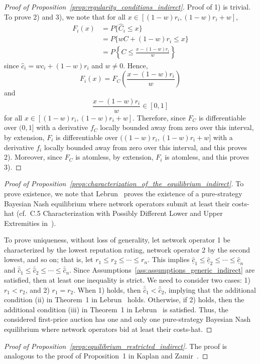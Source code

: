 \begin{proof}[Proof of Proposition~\ref{prop:regularity_conditions_indirect}]
Proof of 1) is trivial. To prove 2) and 3), we note that for all $x\in [(1-w)r_i, (1-w)r_i + w]$,
\begin{align*}
  F_i(x)
  &= P\{\hat{C}_i\le x\} \\
  &= P\{wC + (1-w)r_i\le x\} \\
  &= P\left\{ C\le \frac{x - (1-w)r_i}{w} \right\}
\end{align*}
since $\hat{c}_i = wc_i + (1-w)r_i$ and $w\neq 0$. Hence,
\begin{equation*}
  F_i(x) = F_C\left( \frac{x - (1-w)r_i}{w} \right)
\end{equation*}
and
\begin{equation*}
  \frac{x - (1-w)r_i}{w}\in [0,1]
\end{equation*}
for all $x\in [(1-w)r_i, (1-w)r_i + w]$. Therefore, since $F_C$ is differentiable over $(0,1]$ with a derivative $f_C$ locally bounded away from zero over this interval, by extension, $F_i$ is differentiable over $((1-w)r_i, (1-w)r_i + w]$ with a derivative $f_i$ locally bounded away from zero over this interval, and this proves 2). Moreover, since $F_C$ is atomless, by extension, $F_i$ is atomless, and this proves 3).
\end{proof}

\begin{proof}[Proof of Proposition~\ref{prop:characterization_of_the_equilibrium_indirect}]
To prove existence, we note that Lebrun~\cite{Lebrun2006} proves the existence of a pure-strategy Bayesian Nash equilibrium where network operators submit at least their costs-hat (cf.~C.5 Characterization with Possibly Different Lower and Upper Extremities in~\cite{Lebrun2006}).

To prove uniqueness, without loss of generality, let network operator 1 be characterized by the lowest reputation rating, network operator 2 by the second lowest, and so on; that is, let $r_1 \leq r_2 \leq\cdots \leq r_n$. This implies $\underline{\hat{c}}_1 \leq \underline{\hat{c}}_2 \leq\cdots \leq \underline{\hat{c}}_n$ and $\bar{\hat{c}}_1 \leq \bar{\hat{c}}_2 \leq \cdots\leq \bar{\hat{c}}_n$. Since Assumptions~\ref{ass:assumptions_generic_indirect} are satisfied, then at least one inequality is strict. We need to consider two cases: 1) $r_1 < r_2$, and 2) $r_1 = r_2$. When 1) holds, then $\bar{\hat{c}}_1 < \bar{\hat{c}}_2$, implying that the additional condition (ii) in Theorem~1 in Lebrun~\cite{Lebrun2006} holds. Otherwise, if 2) holds, then the additional condition (iii) in Theorem~1 in Lebrun~\cite{Lebrun2006} is satisfied. Thus, the considered first-price auction has one and only one pure-strategy Bayesian Nash equilibrium where network operators bid at least their costs-hat.
\end{proof}

\begin{proof}[Proof of Proposition~\ref{prop:equilibrium_restricted_indirect}]
The proof is analogous to the proof of Proposition~1 in Kaplan and Zamir~\cite{KaplanZamir2007}.
\end{proof}
